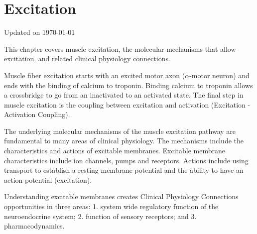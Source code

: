\chapter{Excitation}\label{chp:excitation}
Updated on \today

\minitoc

This chapter covers muscle excitation, the molecular mechanisms that allow excitation, and related clinical physiology connections. 

Muscle fiber excitation starts with an excited motor axon ($\alpha$-motor neuron) and ends with the binding of calcium to troponin. Binding calcium to troponin allows a crossbridge to go from an inactivated to an activated state. The final step in muscle excitation is the coupling between excitation and activation (Excitation - Activation Coupling). 

The underlying molecular mechanisms of the muscle excitation pathway are fundamental to many areas of clinical physiology. The mechanisms include the characteristics and actions of excitable membranes. Excitable membrane characteristics include ion channels, pumps and receptors. Actions include using transport to establish a resting membrane potential and the ability to have an action potential (excitation). 

Understanding excitable membranes creates Clinical Physiology Connections opportunities in three areas: 1. system wide regulatory function of the neuroendocrine system; 2. function of sensory receptors; and 3. pharmacodynamics.

\vspace{5mm}

